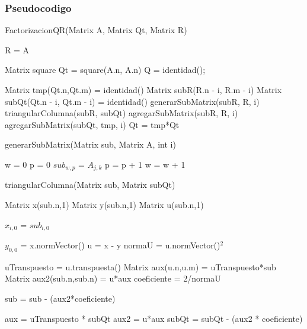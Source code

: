 \subsubsection{Pseudocodigo}

\begin{algorithm}[H]
\caption{FactorizacionQR(Matrix A, Matrix Qt, Matrix R)}
\label{pseudo:Factorizacion-QR}
\begin{algorithmic}

\STATE R = A

\STATE Matrix square 
\STATE Qt = square(A.n, A.n)
\STATE Q = identidad();

        \STATE Matrix tmp(Qt.n,Qt.m) = identidad()
        \STATE Matrix subR(R.n - i, R.m - i)
        \STATE Matrix subQt(Qt.n - i, Qt.m - i) = identidad()
        	   \STATE generarSubMatrix(subR, R, i)
            \STATE triangularColumna(subR, subQt)
            \STATE agregarSubMatrix(subR, R, i)
            \STATE agregarSubMatrix(subQt, tmp, i)	
        \ENDIF
	\STATE Qt = tmp*Qt
\ENDFOR
\end{algorithmic}
\end{algorithm}


\begin{algorithm}[H]
\caption{generarSubMatrix(Matrix sub, Matrix A, int i)}
\label{pseudo:generar-sub-matrix}
\begin{algorithmic}

\STATE w = 0
	\STATE p = 0
		\STATE $sub_{w,p}$ = $A_{j,k}$
		\STATE p = p + 1
	\ENDFOR
	\STATE w = w + 1
\ENDFOR
\end{algorithmic}
\end{algorithm}



\begin{algorithm}[H]
\caption{triangularColumna(Matrix sub, Matrix subQt)}
\label{pseudo:triangular-columna}
\begin{algorithmic}

\STATE Matrix x(sub.n,1)
\STATE Matrix y(sub.n,1)
\STATE Matrix u(sub.n,1)

  	\STATE $x_{i,0}$ = $sub_{i,0}$
\ENDFOR

\STATE $y_{0,0}$ = x.normVector()
\STATE u = x - y
\STATE normaU = u.normVector()$^2$

\STATE uTranspuesto = u.transpuesta()
\STATE Matrix aux(u.n,u.m) = uTranspuesto*sub
\STATE Matrix aux2(sub.n,sub.n) = u*aux
\STATE coeficiente = 2/normaU

\STATE sub = sub - (aux2*coeficiente)

\STATE aux = uTranspuesto * subQt
\STATE aux2 = u*aux
\STATE subQt = subQt - (aux2 * coeficiente)

\end{algorithmic}
\end{algorithm}


